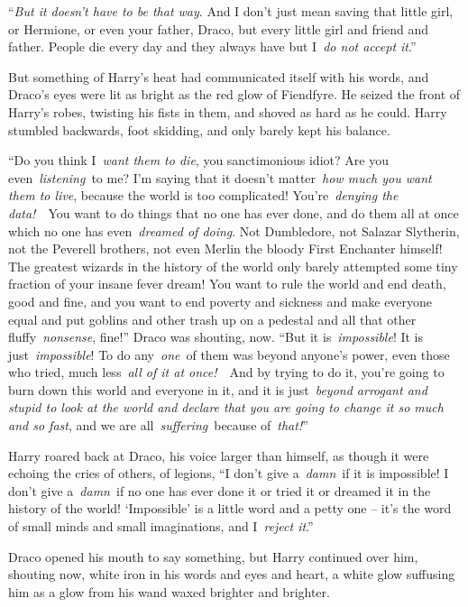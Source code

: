 ``\emph{But it doesn't have to be that way}. And I don't just mean
saving that little girl, or Hermione, or even your father, Draco, but
every little girl and friend and father. People die every day and they
always have but I~\emph{do not accept it}.''

But something of Harry's heat had communicated itself with his words,
and Draco's eyes were lit as bright as the red glow of Fiendfyre. He
seized the front of Harry's robes, twisting his fists in them, and
shoved as hard as he could. Harry stumbled backwards, foot skidding, and
only barely kept his balance.

``Do you think I~\emph{want them to die}, you sanctimonious idiot? Are
you even~\emph{listening}~to me? I'm saying that it doesn't
matter~\emph{how much you want them to live}, because the world is too
complicated! You're~\emph{denying the data!}~~You want to do things that
no one has ever done, and do them all at once which no one has
even~\emph{dreamed of doing}. Not Dumbledore, not Salazar Slytherin, not
the Peverell brothers, not even Merlin the bloody First Enchanter
himself! The greatest wizards in the history of the world only barely
attempted some tiny fraction of your insane fever dream! You want to
rule the world and end death, good and fine, and you want to end poverty
and sickness and make everyone equal and put goblins and other trash up
on a pedestal and all that other fluffy~\emph{nonsense}, fine!'' Draco
was shouting, now. ``But it is~\emph{impossible}! It is
just~\emph{impossible}! To do any~\emph{one}~of them was beyond anyone's
power, even those who tried, much less~\emph{all of it at once!}~~And by
trying to do it, you're going to burn down this world and everyone in
it, and it is just~\emph{beyond arrogant and stupid to look at the world
and declare that you are going to change it so much and so fast}, and we
are all~\emph{suffering}~because of~\emph{that!}''

Harry roared back at Draco, his voice larger than himself, as though it
were echoing the cries of others, of legions, ``I don't give
a~\emph{damn}~if it is impossible! I don't give a~\emph{damn}~if no one
has ever done it or tried it or dreamed it in the history of the world!
`Impossible' is a little word and a petty one -- it's the word of small
minds and small imaginations, and I~\emph{reject it}.''

Draco opened his mouth to say something, but Harry continued over him,
shouting now, white iron in his words and eyes and heart, a white glow
suffusing him as a glow from his wand waxed brighter and brighter.

